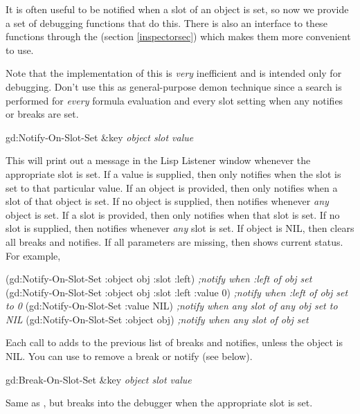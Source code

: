 It is often useful to be notified when a slot of an object is set, so now
we provide a set of debugging functions that do this.   There is also an
interface to these functions through the  (section
\ref{inspectorsec}) which makes them more convenient to use.

Note that the
implementation of this is {\it very} inefficient and is intended only
for debugging.  Don't use this as general-purpose demon technique
since a search is performed for {\it every} formula evaluation and every
slot setting when any notifies or breaks are set.

\begin{programexample}
gd:Notify-On-Slot-Set \&key {\it object  slot  value} \value{function}
\end{programexample}

This will print out a message in the Lisp Listener window whenever the
appropriate slot is set.  If a value is supplied, then only notifies
when the slot is set to that particular value.
If an object is provided, then only notifies
when a slot of that object is set.  If no object is supplied, then
notifies whenever {\it any} object is set.  If a slot is provided, then
only notifies when that slot is set.  If no slot is supplied, then
notifies whenever {\it any} slot is set.  If object is NIL, then clears
all breaks and notifies.  If all parameters are missing, then shows
current status.  For example,
\begin{programexample}
(gd:Notify-On-Slot-Set :object obj :slot :left) {\it ;notify when :left of obj set}
(gd:Notify-On-Slot-Set :object obj :slot :left :value 0) {\it ;notify when :left of obj set to 0}
(gd:Notify-On-Slot-Set :value NIL) {\it ;notify when any slot of any obj set to NIL}
(gd:Notify-On-Slot-Set :object obj) {\it ;notify when any slot of obj set}
\end{programexample}

Each call to  adds to the previous list of
breaks and notifies, unless the object is NIL.  You can use
 to remove a break or notify (see below).

\begin{programexample}
gd:Break-On-Slot-Set \&key {\it object  slot  value} \value{function}
\end{programexample}

Same as , but breaks into the debugger when the
appropriate slot is set.


